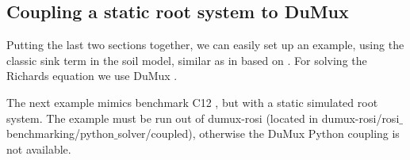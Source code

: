 \subsection{Coupling a static root system to DuMux} \label{sec:dumux_coupling}

Putting the last two sections together, we can easily set up an example, using the classic sink term in the soil model, similar as in \citep{leitner2014impact} based on \citep{doussan1998modelling}. For solving the Richards equation we use DuMux \citep{koch2020dumux}.

The next example mimics benchmark C12 \citep{schnepf2019call}, but with a static simulated root system. The example must be run out of dumux-rosi (located in dumux-rosi/rosi$\_$benchmarking/python$\_$solver/coupled), otherwise the DuMux Python coupling is not available. 




